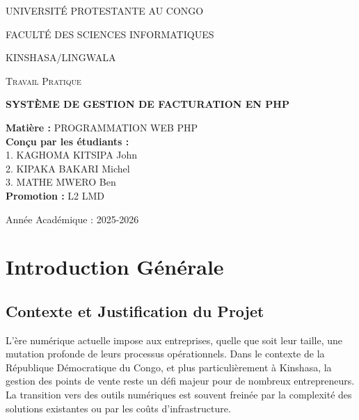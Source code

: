 \documentclass[12pt,a4paper]{report}
\begin{document}
\begin{titlepage}
    \centering
    \vspace*{0.5cm}
    {\scshape\Large UNIVERSITÉ PROTESTANTE AU CONGO \par}
    {\scshape\large FACULTÉ DES SCIENCES INFORMATIQUES \par}
    {\scshape\large KINSHASA/LINGWALA \par}
    \vspace{2cm}
    \vspace{1cm}
    {\scshape\Large Travail Pratique \par}
    \vspace{1cm}
    {\huge\bfseries SYSTÈME DE GESTION DE FACTURATION EN PHP \par}
    \vspace{2cm}
    
    \begin{flushleft}
    {\Large\bfseries Matière :} PROGRAMMATION WEB PHP \\
    \vspace{0.8cm}
    {\Large\bfseries Conçu par les étudiants :} \\
    {\large 1. KAGHOMA KITSIPA John} \\
    {\large 2. KIPAKA BAKARI Michel} \\
    {\large 3. MATHE MWERO Ben} \\
    \vspace{0.8cm}
    {\Large\bfseries Promotion :} L2 LMD \\
    \end{flushleft}
    
    \vfill
    {\large Année Académique : 2025-2026 \par}
\end{titlepage}

\tableofcontents
\newpage

\chapter{Introduction Générale}
\section{Contexte et Justification du Projet}
L'ère numérique actuelle impose aux entreprises, quelle que soit leur taille, une mutation profonde de leurs processus opérationnels. Dans le contexte de la République Démocratique du Congo, et plus particulièrement à Kinshasa, la gestion des points de vente reste un défi majeur pour de nombreux entrepreneurs. La transition vers des outils numériques est souvent freinée par la complexité des solutions existantes ou par les coûts d'infrastructure.
\end{document}
